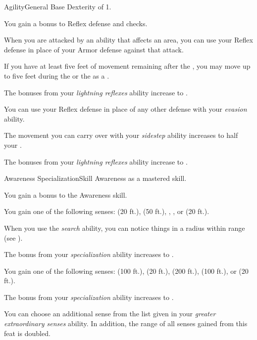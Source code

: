     \begin{feat}{Agility}{General}
        \featpre Base Dexterity of 1.

         You gain a  bonus to Reflex defense and  checks.

         When you are attacked by an ability that affects an area, you can use your Reflex defense in place of your Armor defense against that attack.

         If you have at least five feet of movement remaining after the , you may move up to five feet during the  or the  as a .

         The bonuses from your \textit{lightning reflexes} ability increase to .

         You can use your Reflex defense in place of any other defense with your \textit{evasion} ability.

         The movement you can carry over with your \textit{sidestep} ability increases to half your .

         The bonuses from your \textit{lightning reflexes} ability increase to .
    \end{feat}

    \begin{feat}{Awareness Specialization}{Skill}
        \featpre Awareness as a mastered skill.

         You gain a  bonus to the Awareness skill.

         You gain one of the following senses:  (20 ft.),  (50 ft.), , , or  (20 ft.).

         When you use the \textit{search} ability, you can notice things in a \areasmall radius within \rngclose range (see ).

         The bonus from your \textit{specialization} ability increases to .

         You gain one of the following senses:  (100 ft.),  (20 ft.),  (200 ft.),  (100 ft.), or  (20 ft.).

         The bonus from your \textit{specialization} ability increases to .

         You can choose an additional sense from the list given in your \textit{greater extraordinary senses} ability.
        In addition, the range of all senses gained from this feat is doubled.
    \end{feat}

